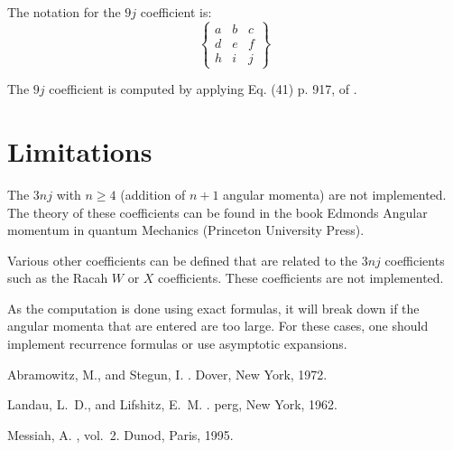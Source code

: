 \documentclass[11pt]{article}
\begin{document}
The notation for the $9j$ coefficient is:
\begin{equation}
  \left\{\begin{array}{cccc} a & b & c \\ d & e & f \\ h & i & j \end{array} \right\} 
\end{equation}

The $9j$ coefficient is computed by applying Eq. (41) p. 917, of \cite{messiah_field_chapter}. 


\section{Limitations}

The $3nj$ with $n\ge 4$ (addition of $n+1$ angular momenta) are not 
implemented. The theory of these coefficients 
can be found in the book Edmonds Angular momentum 
in quantum Mechanics (Princeton University Press). 

Various other coefficients can be defined that are related to the $3nj$ 
coefficients such as the Racah $W$ or $X$ coefficients\cite{messiah_field_chapter}. These coefficients are not implemented.

 
As the computation is done using exact formulas, it will break down if the
angular momenta that are entered are too large. For these cases, one should
implement recurrence formulas or use asymptotic expansions. 
 


\begin{thebibliography}{1}

{\sc Abramowitz, M., and Stegun, I.}
.
\newblock Dover, New York, 1972.

{\sc Landau, L.~D., and Lifshitz, E.~M.}
.
\newblock perg, New York, 1962.

{\sc Messiah, A.}
, vol.~2.
\newblock Dunod, Paris, 1995.

\end{thebibliography}
\end{document}
